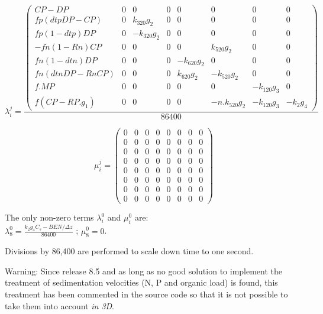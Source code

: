 $$  \lambda_i^j =
  \frac{
  \begin{pmatrix}
    CP-DP               & 0 &            0 & 0 & 0 & 0 & 0 & 0 \\
    fp (dtp DP -CP)     & 0 &  k_{320} g_2  & 0 & 0 & 0 & 0 & 0 \\
    fp (1-dtp) DP       & 0 & -k_{320} g_2  & 0 & 0 & 0 & 0 & 0 \\
   -fn (1 -Rn) CP       & 0 &        0 & 0 & 0 &  k_{520} g_2 & 0 & 0 \\
    fn (1-dtn) DP       & 0 &        0 & 0 & -k_{620} g_2 & 0 & 0 & 0 \\
    fn (dtn DP - Rn CP) & 0 &        0 & 0 &  k_{620} g_2 & -k_{520} g_2 & 0 & 0 \\
    f . MP              & 0 &        0 & 0 & 0 & 0 & -k_{120} g_3 & 0 \\
    f (CP - RP .  g_1 ) & 0 &        0 & 0 & 0 & -n.k_{520} g_2 & -k_{120} g_3 & - k_2 g_4
  \end{pmatrix}
  }{86400}
$$

$$
  \mu_i^j =
  \begin{pmatrix}
   0 & 0 & 0 & 0 & 0 & 0 & 0 & 0 \\
   0 & 0 & 0 & 0 & 0 & 0 & 0 & 0 \\
   0 & 0 & 0 & 0 & 0 & 0 & 0 & 0 \\
   0 & 0 & 0 & 0 & 0 & 0 & 0 & 0 \\
   0 & 0 & 0 & 0 & 0 & 0 & 0 & 0 \\
   0 & 0 & 0 & 0 & 0 & 0 & 0 & 0 \\
   0 & 0 & 0 & 0 & 0 & 0 & 0 & 0 \\
   0 & 0 & 0 & 0 & 0 & 0 & 0 & 0
  \end{pmatrix}
$$

The only non-zero terms $\lambda_i^0$ and $\mu_i^0$ are:\\

$\lambda_8^0 = \frac{k_2 g_4 C_s - BEN/\Delta z}{86400}$ ; $\mu_8^0 = 0$.

Divisions by 86,400 are performed to scale down time to one second.

\begin{WarningBlock}{Warning:}
Since release 8.5 and as long as no good solution to implement the treatment of
sedimentation velocities (N, P and organic load) is found, this treatment has
been commented in the source code so that it is not possible to take them into
account \emph{in 3D}.
\end{WarningBlock}
